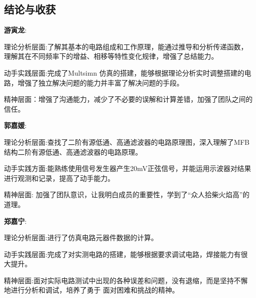 \documentclass[./测控三级项目.tex]{subfiles} %
\begin{document}
	\subsection{结论与收获}
		\textbf{游寅龙}:\par
		理论分析层面:了解其基本的电路组成和工作原理，能通过推导和分析传递函数，理解其在不同频率下的增益、相移等特性变化规律，增强了总结能力。\par
		动手实践层面:完成了Multsimn 仿真的搭建，能够根据理论分析实时调整搭建的电路，增强了独立解决问题的能力并丰富了解决问题的手段。\par
		精神层面：增强了沟通能力，减少了不必要的误解和计算差错，加强了团队之间的信任。\par
		\textbf{郭嘉媛}:\par
		理论分析层面:查找了二阶有源低通、高通滤波器的电路原理图，深入理解了MFB结构二阶有源低通、高通滤波器的电路原理。\par
		动手实践方面:能熟练使用信号发生器产生20mV正弦信号，并能运用示波器对结果进行观测和记录，提高了动手能力。\par
		精神层面: 加强了团队意识，让我明白成员的重要性，学到了“众人拾柴火焰高”的道理。\par
		\textbf{郑嘉宁}:\par
		理论分析层面:进行了仿真电路元器件数据的计算。\par
		动手实践层面:完成了对实测电路的搭建，能够根据要求调试电路，焊接能力有很大提升。\par
		精神层面:面对实际电路测试中出现的各种误差和问题，没有退缩，而是坚持不懈地进行分析和调试，培养了勇于 面对困难和挑战的精神。
	
	
	
\end{document}
